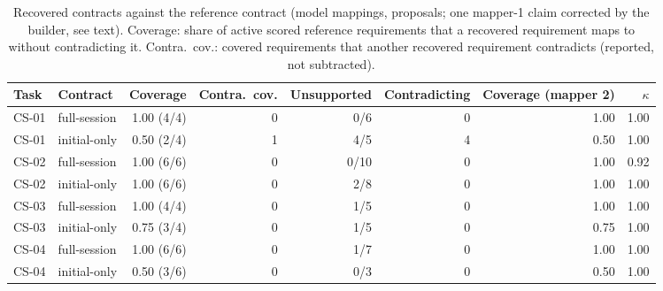 \begin{table}[t]\centering\footnotesize
\caption{Recovered contracts against the reference contract (model mappings, proposals; one mapper-1 claim corrected by the builder, see text). Coverage: share of active scored reference requirements that a recovered requirement maps to without contradicting it. Contra.\ cov.: covered requirements that another recovered requirement contradicts (reported, not subtracted).}\label{tab:coverage}
\begin{tabular}{llrrrrrr}\toprule Task & Contract & Coverage & Contra.\ cov. & Unsupported & Contradicting & Coverage (mapper 2) & $\kappa$ \\\midrule
CS-01 & full-session & 1.00 (4/4) & 0 & 0/6 & 0 & 1.00 & 1.00 \\
CS-01 & initial-only & 0.50 (2/4) & 1 & 4/5 & 4 & 0.50 & 1.00 \\
CS-02 & full-session & 1.00 (6/6) & 0 & 0/10 & 0 & 1.00 & 0.92 \\
CS-02 & initial-only & 1.00 (6/6) & 0 & 2/8 & 0 & 1.00 & 1.00 \\
CS-03 & full-session & 1.00 (4/4) & 0 & 1/5 & 0 & 1.00 & 1.00 \\
CS-03 & initial-only & 0.75 (3/4) & 0 & 1/5 & 0 & 0.75 & 1.00 \\
CS-04 & full-session & 1.00 (6/6) & 0 & 1/7 & 0 & 1.00 & 1.00 \\
CS-04 & initial-only & 0.50 (3/6) & 0 & 0/3 & 0 & 0.50 & 1.00 \\
\bottomrule\end{tabular}\end{table}
